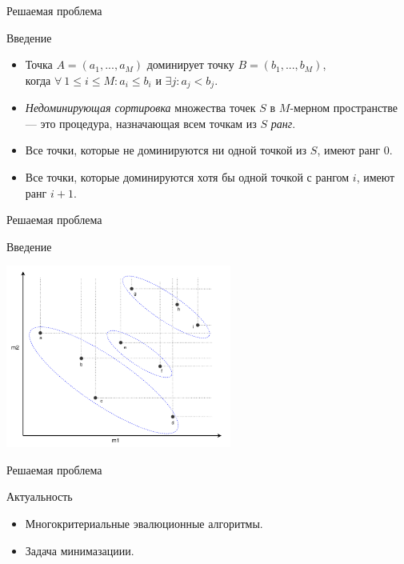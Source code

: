 \documentclass{beamer}
\begin{document}
\begin{frame}{Решаемая проблема}
\begin{block}{Введение}
\begin{itemize}
\item Точка $A=(a_1,...,a_M)$ доминирует точку $B=(b_1,...,b_M)$, \\
когда $\forall ~ 1 \leq i \leq M : a_i \leq b_i$ и $\exists j : a_j < b_j $.
\item \textit{Недоминирующая сортировка} множества точек $S$ в $M$-мерном пространстве — это процедура, назначающая всем точкам из $S$ \textit{ранг}.
\item Все точки, которые не доминируются ни одной точкой из $S$, имеют ранг 0.
\item Все точки, которые доминируются хотя бы одной точкой с рангом $i$, имеют ранг $i+1$.
\end{itemize}
\end{block}
\end{frame}


\begin{frame}{Решаемая проблема}
\begin{block}{Введение}
\begin{center}
\includegraphics*[height=6cm]{pic/non_dominated_sort.png}
\end{center}
\end{block}
\end{frame}

\begin{frame}{Решаемая проблема}
\begin{block}{Актуальность}
\begin{itemize}
\item Многокритериальные эвалюционные алгоритмы. 
\item Задача минимазациии.
\end{itemize}
\end{block}
\end{frame}
\end{document}
